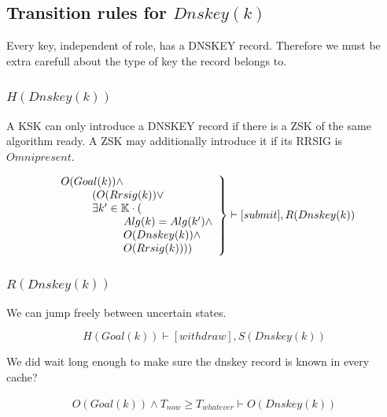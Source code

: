 \documentclass[twoside,english, a4paper]{article}
\newcommand{\mathbox}[1]{#1}
\begin{document}
\subsection{Transition rules for $Dnskey(k)$}

Every key, independent of role, has a DNSKEY record. Therefore we must
be extra carefull about the type of key the record belongs to.

\subsubsection{$H(Dnskey(k))$}

\mathbox{

	A KSK can only introduce a DNSKEY record if there is a ZSK of the
	same algorithm ready. A ZSK may additionally introduce it if its 
	RRSIG is $Omnipresent$.

	\begin{equation}
		\left.
		\begin{array}{l}
			O(Goal(k)) \wedge \\
\hskip 1cm	(O(Rrsig(k)) \vee \\
\hskip 1cm	\exists k' \in \mathbb{K} \cdot ( \\
\hskip 2cm		Alg(k)=Alg(k') \wedge \\
\hskip 2cm		O(Dnskey(k)) \wedge \\
\hskip 2cm		O(Rrsig(k))))\\
		\end{array}
		\right\} \vdash [submit], R(Dnskey(k))
	\end{equation}
}

\subsubsection{$R(Dnskey(k))$}

\mathbox{

	We can jump freely between uncertain states.
	
	\begin{equation}
			H(Goal(k)) \vdash [withdraw], S(Dnskey(k))
	\end{equation}

	We did wait long enough to make sure the dnskey record is known in 
	every cache?
	
	\begin{equation}
		\begin{split}
			O(Goal(k)) \wedge T_{now} \geq T_{whatever} \vdash O(Dnskey(k))
		\end{split}
	\end{equation}
}
\end{document}
